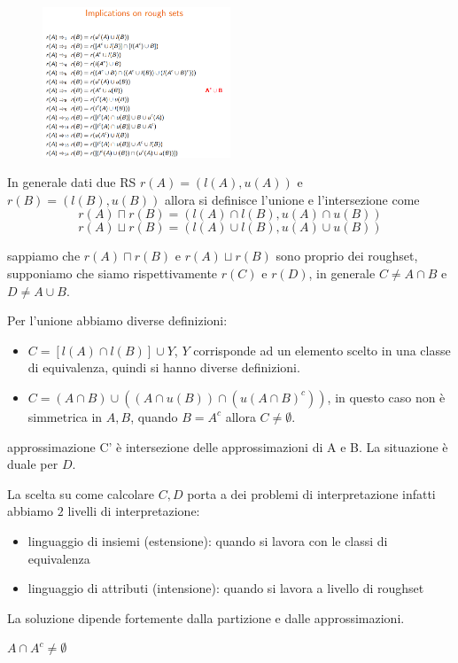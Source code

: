 \begin{figure}[!h]
    \centering
    \includegraphics[width=0.5\textwidth]{img/sistemi_incerti/impl_RS.png}
\end{figure}

In generale dati due RS $r(A) = (l(A), u(A))$ e $r(B)=(l(B),u(B))$ allora si 
definisce l'unione e l'intersezione  come 
$$r(A)  \sqcap r(B) = (l(A)\cap l(B),u(A)\cap u(B))$$
$$r(A)  \sqcup r(B) = (l(A)\cup l(B),u(A)\cup u(B))$$

sappiamo che $r(A)  \sqcap r(B)$ e $r(A)  \sqcup r(B)$ sono proprio dei roughset,
supponiamo che siamo rispettivamente $r(C)$ e $r(D)$, in generale $C\ne A\cap B$ e $D\ne A\cup B$.

Per l'unione abbiamo diverse definizioni:
\begin{itemize}
    \item $C= [l(A)\cap l(B)] \cup Y$, $Y$ corrisponde ad un elemento scelto in una 
    classe di equivalenza, quindi si hanno diverse definizioni.
    \item $C=(A\cap B) \cup ((A\cap u(B))\cap(u(A\cap B)^c))$, in questo caso non 
    è simmetrica in $A,B$, quando $B=A^c$ allora $C\ne \emptyset$.
\end{itemize}

approssimazione C' è intersezione delle approssimazioni di A e B. La situazione è 
duale per $D$.

La scelta su come calcolare $C,D$ porta a dei problemi di interpretazione infatti 
abbiamo $2$ livelli di interpretazione:
\begin{itemize}
    \item linguaggio di insiemi (estensione): quando si lavora con le classi di equivalenza
    \item linguaggio di attributi (intensione): quando si lavora a livello di roughset
\end{itemize}
La soluzione dipende fortemente dalla partizione e dalle approssimazioni.

\begin{nota}
    $A\cap A^c \ne \emptyset$ 
\end{nota}

